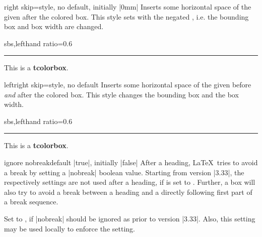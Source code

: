 \begin{docTcbKey}[][doc new=2014-11-07]{right skip}{=}{style, no default, initially |0mm|}
  Inserts some horizontal space of the given  after the colored box.
  This style sets  with the negated ,
  i.e. the bounding box and box width are changed.
\begin{dispExample*}{sbs,lefthand ratio=0.6}
\noindent\rule{\linewidth}{2pt}

\begin{tcolorbox}[right skip=1cm,
    colframe=red!50!white]
  This is a \textbf{tcolorbox}.
\end{tcolorbox}
\end{dispExample*}
\end{docTcbKey}

\begin{docTcbKey}[][doc new=2014-10-10]{leftright skip}{=}{style, no default}
  Inserts some horizontal space of the given  before \emph{and} after the colored box.
  This style changes the bounding box and the box width.
\begin{dispExample*}{sbs,lefthand ratio=0.6}
\noindent\rule{\linewidth}{2pt}

\begin{tcolorbox}[leftright skip=1cm,
    colframe=red!50!white]
  This is a \textbf{tcolorbox}.
\end{tcolorbox}
\end{dispExample*}
\end{docTcbKey}


\begin{docTcbKey}[][doc new=2014-12-11]{ignore nobreak}{}{default |true|, initially |false|}
After a heading, \LaTeX\ tries to avoid a break by setting a |nobreak| boolean value.
Starting from version |3.33|, the  respectively 
settings are not used after a heading, if  is
set to . Further, a  box will also try to
avoid a break between a heading and a directly following first part of a
break sequence.

Set  to , if |nobreak| should be
ignored as prior to version |3.33|. Also, this setting may be used locally to
enforce the  setting.
\end{docTcbKey}



